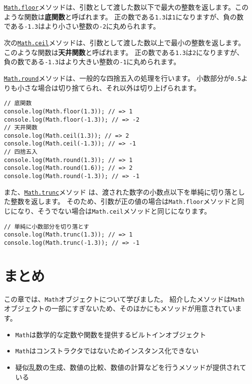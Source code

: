 \href{https://developer.mozilla.org/ja/docs/Web/JavaScript/Reference/Global_Objects/Math/floor}{\texttt{Math.floor}}メソッドは、引数として渡した数以下で最大の整数を返します。このような関数は\textbf{底関数}と呼ばれます。
正の数である\texttt{1.3}は\texttt{1}になりますが、負の数である\texttt{-1.3}はより小さい整数の\texttt{-2}に丸められます。

次の\href{https://developer.mozilla.org/ja/docs/Web/JavaScript/Reference/Global_Objects/Math/ceil}{\texttt{Math.ceil}}メソッドは、引数として渡した数以上で最小の整数を返します。このような関数は\textbf{天井関数}と呼ばれます。
正の数である\texttt{1.3}は\texttt{2}になりますが、負の数である\texttt{-1.3}はより大きい整数の\texttt{-1}に丸められます。

\href{https://developer.mozilla.org/ja/docs/Web/JavaScript/Reference/Global_Objects/Math/round}{\texttt{Math.round}}メソッドは、一般的な四捨五入の処理を行います。
小数部分が\texttt{0.5}よりも小さな場合は切り捨てられ、それ以外は切り上げられます。

\begin{lstlisting}
// 底関数
console.log(Math.floor(1.3)); // => 1
console.log(Math.floor(-1.3)); // => -2
// 天井関数
console.log(Math.ceil(1.3)); // => 2
console.log(Math.ceil(-1.3)); // => -1
// 四捨五入
console.log(Math.round(1.3)); // => 1
console.log(Math.round(1.6)); // => 2
console.log(Math.round(-1.3)); // => -1
\end{lstlisting}

また、\href{https://developer.mozilla.org/ja/docs/Web/JavaScript/Reference/Global_Objects/Math/trunc}{\texttt{Math.trunc}}メソッド\,\protect{}\,は、渡された数字の小数点以下を単純に切り落とした整数を返します。
そのため、引数が正の値の場合は\texttt{Math.floor}メソッドと同じになり、そうでない場合は\texttt{Math.ceil}メソッドと同じになります。

\begin{lstlisting}
// 単純に小数部分を切り落とす
console.log(Math.trunc(1.3)); // => 1
console.log(Math.trunc(-1.3)); // => -1
\end{lstlisting}

\hypertarget{conclusion}{%
\section{まとめ}\label{conclusion}}

この章では、\texttt{Math}オブジェクトについて学びました。
紹介したメソッドは\texttt{Math}オブジェクトの一部にすぎないため、そのほかにもメソッドが用意されています。

\begin{itemize}
\item
  \texttt{Math}は数学的な定数や関数を提供するビルトインオブジェクト
\item
  \texttt{Math}はコンストラクタではないためインスタンス化できない
\item
  疑似乱数の生成、数値の比較、数値の計算などを行うメソッドが提供されている
\end{itemize}
